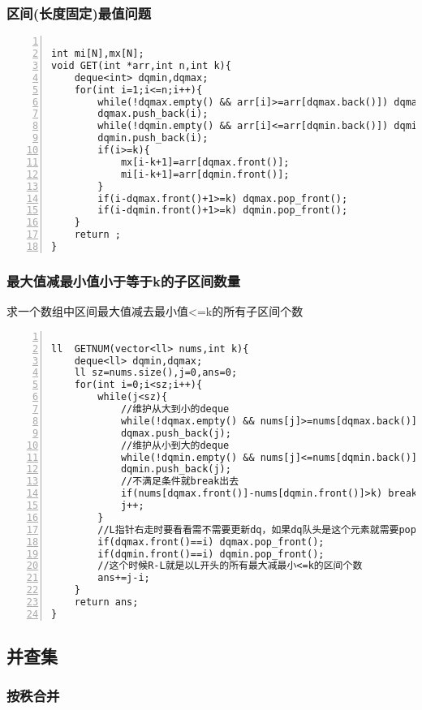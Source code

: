 \subsubsection{区间(长度固定)最值问题}


\begin{lstlisting}[language={[ANSI]C},numbers=left]

int mi[N],mx[N];
void GET(int *arr,int n,int k){
	deque<int> dqmin,dqmax;
	for(int i=1;i<=n;i++){
		while(!dqmax.empty() && arr[i]>=arr[dqmax.back()]) dqmax.pop_back();
		dqmax.push_back(i);
		while(!dqmin.empty() && arr[i]<=arr[dqmin.back()]) dqmin.pop_back();
		dqmin.push_back(i);
		if(i>=k){
			mx[i-k+1]=arr[dqmax.front()];
			mi[i-k+1]=arr[dqmin.front()];
		}
		if(i-dqmax.front()+1>=k) dqmax.pop_front();
		if(i-dqmin.front()+1>=k) dqmin.pop_front();
	}
	return ;
}
\end{lstlisting}

\subsubsection{最大值减最小值小于等于k的子区间数量}

求一个数组中区间最大值减去最小值<=k的所有子区间个数
\begin{lstlisting}[language={[ANSI]C},numbers=left]

ll  GETNUM(vector<ll> nums,int k){
	deque<ll> dqmin,dqmax;
	ll sz=nums.size(),j=0,ans=0;
	for(int i=0;i<sz;i++){
		while(j<sz){
            //维护从大到小的deque
			while(!dqmax.empty() && nums[j]>=nums[dqmax.back()]) dqmax.pop_back();
			dqmax.push_back(j);
            //维护从小到大的deque            
			while(!dqmin.empty() && nums[j]<=nums[dqmin.back()]) dqmin.pop_back();
			dqmin.push_back(j);
            //不满足条件就break出去
			if(nums[dqmax.front()]-nums[dqmin.front()]>k) break;
			j++;
		}
        //L指针右走时要看看需不需要更新dq，如果dq队头是这个元素就需要pop出去
		if(dqmax.front()==i) dqmax.pop_front();
		if(dqmin.front()==i) dqmin.pop_front();
        //这个时候R-L就是以L开头的所有最大减最小<=k的区间个数
		ans+=j-i;
	}
	return ans;
}
\end{lstlisting}

\subsection{并查集}

\subsubsection{按秩合并}

